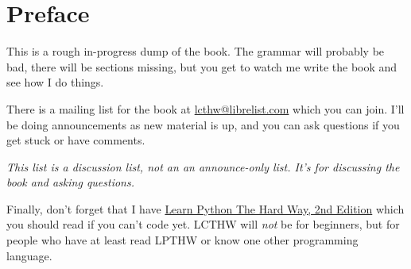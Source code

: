 \chapter*{Preface}

This is a rough in-progress dump of the book.  The grammar will probably be bad, there
will be sections missing, but you get to watch me write the book and see how I do things.

There is a mailing list for the book at
\href{mailto:lcthw@librelist.com}{lcthw@librelist.com} which you can join.
I'll be doing announcements as new material is up, and you can ask questions if
you get stuck or have comments. 

\emph{This list is a discussion list, not an an announce-only list.  It's for discussing the book and asking questions.}

Finally, don't forget that I have \href{http://learnpythonthehardway.org}{Learn
Python The Hard Way, 2nd Edition} which you should read if you can't code yet.
LCTHW will \emph{not} be for beginners, but for people who have at least read
LPTHW or know one other programming language.


